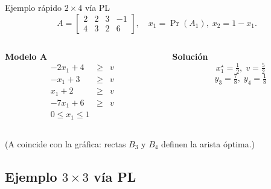 \documentclass{beamer}
\begin{document}
\begin{frame}{Ejemplo rápido \(2\times4\) vía PL}
\small
\[
A=\begin{bmatrix}
2 & 2 & 3 & -1\\
4 & 3 & 2 &  6
\end{bmatrix},
\quad x_1=\Pr(A_1),\;x_2=1-x_1.
\]

\begin{columns}[T]
\begin{column}{0.52\linewidth}
\textbf{Modelo A}
{\footnotesize
\[
\renewcommand{\arraystretch}{1.1}
\begin{array}{rcr}
-2x_1+4 &\ge& v\\
- x_1+3 &\ge& v\\
  x_1+2 &\ge& v\\
-7x_1+6 &\ge& v\\
0\le x_1\le1
\end{array}
\]
}
\end{column}
%
\begin{column}{0.46\linewidth}
\textbf{Solución}
\[
x_1^\star=\tfrac12,\;
v=\tfrac52
\]
\vspace{-0.4em}
\[
y_3=\tfrac78,\;
y_4=\tfrac18
\]
\end{column}
\end{columns}

\begin{center}\scriptsize
(A coincide con la gráfica: rectas \(B_3\) y \(B_4\) definen la arista óptima.)
\end{center}
\end{frame}

\subsection{Ejemplo \(3\times3\) vía PL}
\end{document}
